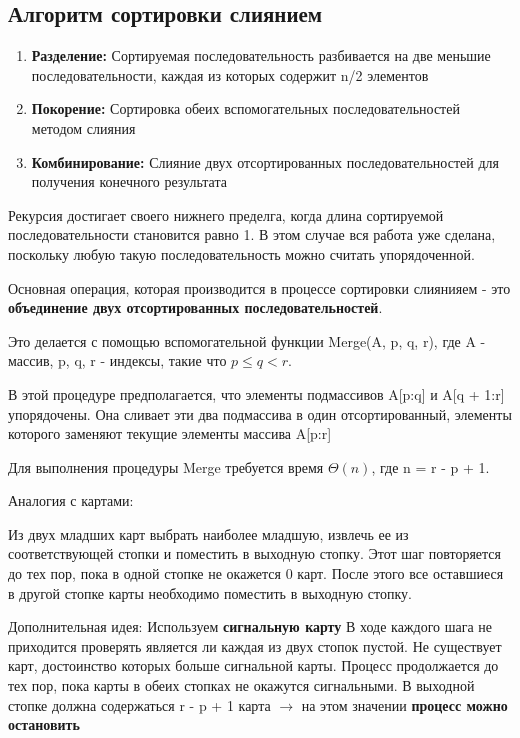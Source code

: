\documentclass[a4paper, 12pt]{article}
\begin{document}
\subsection{Алгоритм сортировки слиянием}

\begin{enumerate}  
    \item \textbf{Разделение:} Сортируемая последовательность разбивается на две меньшие последовательности, 
    каждая из которых содержит n/2 элементов
    \item \textbf{Покорение:} Сортировка обеих вспомогательных последовательностей методом слияния
    \item \textbf{Комбинирование:} Слияние двух отсортированных последовательностей для получения конечного результата
\end{enumerate}

Рекурсия достигает своего нижнего пределга, когда длина сортируемой последовательности становится равно 1.
В этом случае вся работа уже сделана, поскольку любую такую последовательность можно считать упорядоченной.

Основная операция, которая производится в процессе сортировки слиянияем - 
это \textbf{объединение двух отсортированных последовательностей}.

Это делается с помощью вспомогательной функции Merge(A, p, q, r), где A - массив, p, q, r - индексы, такие что $p \leq q < r$.

В этой процедуре предполагается, что элементы подмассивов A[p:q] и A[q + 1:r] упорядочены. 
Она сливает эти два подмассива в один отсортированный, элементы которого заменяют текущие элементы массива A[p:r]

Для выполнения процедуры Merge требуется время $\Theta(n)$, где n = r - p + 1.

Аналогия с картами:

Из двух младших карт выбрать наиболее младшую, извлечь ее из соответствующей стопки и поместить в выходную стопку. 
Этот шаг повторяется до тех пор, пока в одной стопке не окажется 0 карт. После этого все оставшиеся в другой стопке карты 
необходимо поместить в выходную стопку.

Дополнительная идея: Используем \textbf{сигнальную карту}
В ходе каждого шага не приходится проверять является ли каждая из двух стопок пустой. 
Не существует карт, достоинство которых больше сигнальной карты. Процесс продолжается до тех пор,
пока карты в обеих стопках не окажутся сигнальными. 
В выходной стопке должна содержаться r - p + 1 карта $\rightarrow$ на этом значении \textbf{процесс можно остановить}
\end{document}
